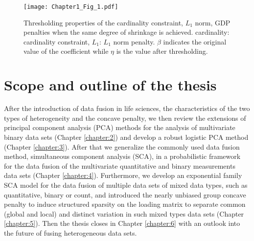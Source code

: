 \begin{figure}[htbp]
    \centering
    \texttt{[image: Chapter1\_Fig\_1.pdf]}
    \caption{Thresholding properties of the cardinality constraint, $L_{1}$ norm, GDP penalties when the same degree of shrinkage is achieved. cardinality: cardinality constraint, $L_{1}$: $L_{1}$ norm penalty. $\beta$ indicates the original value of the coefficient while $\eta$ is the value after thresholding.}
    \label{chapter1_fig:1}
\end{figure}

\section{Scope and outline of the thesis}
After the introduction of data fusion in life sciences, the characteristics of the two types of heterogeneity and the concave penalty, we then review the extensions of principal component analysis (PCA) methods for the analysis of multivariate binary data sets (Chapter \ref{chapter:2}) and develop a robust logistic PCA method (Chapter \ref{chapter:3}). After that we generalize the commonly used data fusion method, simultaneous component analysis (SCA), in a probabilistic framework for the data fusion of the multivariate quantitative and binary measurements data sets (Chapter \ref{chapter:4}). Furthermore, we develop an exponential family SCA model for the data fusion of multiple data sets of mixed data types, such as quantitative, binary or count, and introduced the nearly unbiased group concave penalty to induce structured sparsity on the loading matrix to separate common (global and local) and distinct variation in such mixed types data sets (Chapter \ref{chapter:5}). Then the thesis closes in Chapter \ref{chapter:6} with an outlook into the future of fusing heterogeneous data sets. 